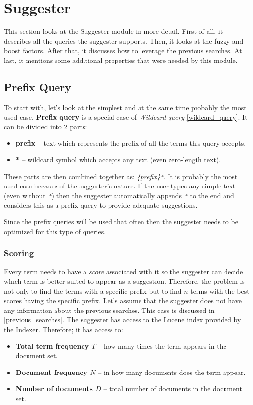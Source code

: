 \section{Suggester}
\label{suggester_module}
This section looks at the Suggester module in more detail. First of all, it describes all the queries the suggester supports.
Then, it looks at the fuzzy and boost factors. After that, it discusses how to leverage the previous searches. At last, it mentions some
additional properties that were needed by this module.

\subsection{Prefix Query}
\label{prefix_query}
To start with, let's look at the simplest and at the same time probably the most used case. \textbf{Prefix query} is a special case of
\textit{Wildcard query} \ref{wildcard_query}.
It can be divided into 2 parts:
\begin{itemize}
    \item \textbf{prefix} – text which represents the prefix of all the terms this query accepts.
    \item \textbf{*} – wildcard symbol which accepts any text (even zero-length text).
\end{itemize}

These parts are then combined together as: \textit{\{prefix\}*}.
It is probably the most used case because of the suggester's nature. If the user types any simple text (even without \textit{*}) then
the suggester automatically appends \textit{*} to the end and considers this as a prefix query to provide adequate suggestions.

Since the prefix queries will be used that often then the suggester needs to be optimized for this type of queries.

\subsubsection{Scoring}
\label{prefix_scoring}
Every term needs to have a \textit{score} associated with it so the suggester can decide which term is better suited
to appear as a suggestion. Therefore, the problem is not only to find the terms with a specific prefix but to find $n$
terms with the best scores having the specific prefix. Let's assume that the suggester does not have any information
about the previous searches. This case is discussed in
\ref{previous_searches}. The suggester has access to the Lucene index provided by the Indexer. %
Therefore; it has access to:
\begin{itemize}
    \item \textbf{Total term frequency $T$} – how many times the term appears in the document set.
    \item \textbf{Document frequency $N$} – in how many documents does the term appear.
    \item \textbf{Number of documents $D$} – total number of documents in the document set.
\end{itemize}

